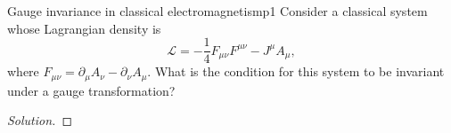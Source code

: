 \begin{problem}{Gauge invariance in classical electromagnetism}{p1}
   Consider a classical system whose Lagrangian density is 
   \begin{equation*}
      \mathcal{L} = - \frac14 F_{\mu \nu}F^{\mu\nu} - J^\mu A_\mu,
   \end{equation*}
   where \(F_{\mu \nu} = \partial_\mu A_\nu - \partial_\nu A_\mu.\) What is the condition for this system to be invariant under a gauge transformation?
\end{problem}
\begin{proof}[Solution]
    
\end{proof}
